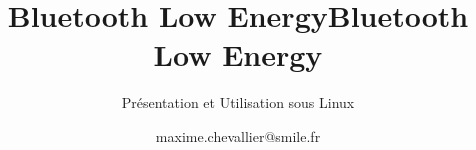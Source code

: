 \documentclass{smilebeamer}
\title{Bluetooth Low Energy}
\author{maxime.chevallier@smile.fr}
\begin{document}
\begin{frame}[plain]
    \title{Bluetooth Low Energy}
    \subtitle{Présentation et Utilisation sous Linux}
    \titlepage
\end{frame}






\end{document}
